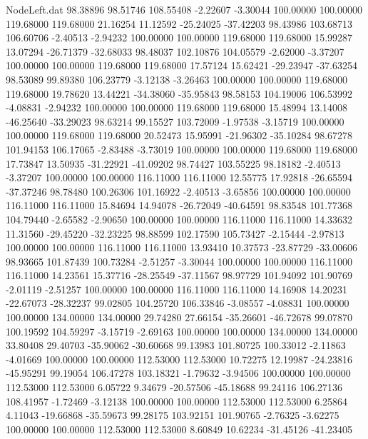 \begin{filecontents}{NodeLeft.dat}
  98.38896   98.51746  108.55408    -2.22607   -3.30044  100.00000  100.00000  119.68000  119.68000   21.16254   11.12592  -25.24025  -37.42203
  98.43986  103.68713  106.60706    -2.40513   -2.94232  100.00000  100.00000  119.68000  119.68000   15.99287   13.07294  -26.71379  -32.68033
  98.48037  102.10876  104.05579    -2.62000   -3.37207  100.00000  100.00000  119.68000  119.68000   17.57124   15.62421  -29.23947  -37.63254
  98.53089   99.89380  106.23779    -3.12138   -3.26463  100.00000  100.00000  119.68000  119.68000   19.78620   13.44221  -34.38060  -35.95843
  98.58153  104.19006  106.53992    -4.08831   -2.94232  100.00000  100.00000  119.68000  119.68000   15.48994   13.14008  -46.25640  -33.29023
  98.63214   99.15527  103.72009    -1.97538   -3.15719  100.00000  100.00000  119.68000  119.68000   20.52473   15.95991  -21.96302  -35.10284
  98.67278  101.94153  106.17065    -2.83488   -3.73019  100.00000  100.00000  119.68000  119.68000   17.73847   13.50935  -31.22921  -41.09202
  98.74427  103.55225   98.18182    -2.40513   -3.37207  100.00000  100.00000  116.11000  116.11000   12.55775   17.92818  -26.65594  -37.37246
  98.78480  100.26306  101.16922    -2.40513   -3.65856  100.00000  100.00000  116.11000  116.11000   15.84694   14.94078  -26.72049  -40.64591
  98.83548  101.77368  104.79440    -2.65582   -2.90650  100.00000  100.00000  116.11000  116.11000   14.33632   11.31560  -29.45220  -32.23225
  98.88599  102.17590  105.73427    -2.15444   -2.97813  100.00000  100.00000  116.11000  116.11000   13.93410   10.37573  -23.87729  -33.00606
  98.93665  101.87439  100.73284    -2.51257   -3.30044  100.00000  100.00000  116.11000  116.11000   14.23561   15.37716  -28.25549  -37.11567
  98.97729  101.94092  101.90769    -2.01119   -2.51257  100.00000  100.00000  116.11000  116.11000   14.16908   14.20231  -22.67073  -28.32237
  99.02805  104.25720  106.33846    -3.08557   -4.08831  100.00000  100.00000  134.00000  134.00000   29.74280   27.66154  -35.26601  -46.72678
  99.07870  100.19592  104.59297    -3.15719   -2.69163  100.00000  100.00000  134.00000  134.00000   33.80408   29.40703  -35.90062  -30.60668
  99.13983  101.80725  100.33012    -2.11863   -4.01669  100.00000  100.00000  112.53000  112.53000   10.72275   12.19987  -24.23816  -45.95291
  99.19054  106.47278  103.18321    -1.79632   -3.94506  100.00000  100.00000  112.53000  112.53000    6.05722    9.34679  -20.57506  -45.18688
  99.24116  106.27136  108.41957    -1.72469   -3.12138  100.00000  100.00000  112.53000  112.53000    6.25864    4.11043  -19.66868  -35.59673
  99.28175  103.92151  101.90765    -2.76325   -3.62275  100.00000  100.00000  112.53000  112.53000    8.60849   10.62234  -31.45126  -41.23405

\end{filecontents}
